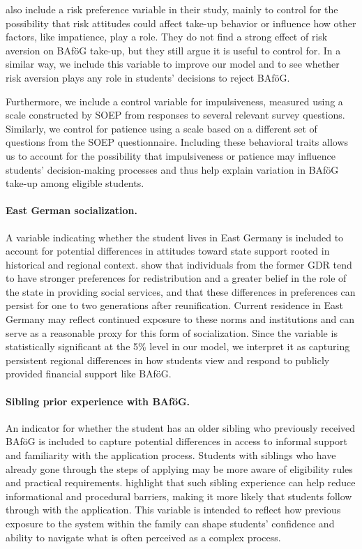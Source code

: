 \cite{herber_non-take-up_2019} also include a risk preference variable in their study, mainly to control for the possibility that risk attitudes could affect take-up behavior or influence how other factors, like impatience, play a role. 
They do not find a strong effect of risk aversion on BAföG take-up, but they still argue it is useful to control for. 
In a similar way, we include this variable to improve our model and to see whether risk aversion plays any role in students’ decisions to reject BAföG.

Furthermore, we include a control variable for impulsiveness, measured using a scale constructed by SOEP from responses to several relevant survey questions.
Similarly, we control for patience using a scale based on a different set of questions from the SOEP questionnaire.
Including these behavioral traits allows us to account for the possibility that impulsiveness or patience may influence students’ decision-making processes and thus help explain variation in BAföG take-up among eligible students.

\paragraph{East German socialization.}  A variable indicating whether the student lives in East Germany is included to account for potential differences in attitudes toward state support rooted in historical and regional context. \cite{alesina_good-bye_2007} show that individuals from the former GDR tend to have stronger preferences for redistribution and a greater belief in the role of the state in providing social services, and that these differences in preferences can persist for one to two generations after reunification. Current residence in East Germany may reflect continued exposure to these norms and institutions and can serve as a reasonable proxy for this form of socialization. Since the variable is statistically significant at the 5\% level in our model, we interpret it as capturing persistent regional differences in how students view and respond to publicly provided financial support like BAföG.

\paragraph{Sibling prior experience with BAföG.} An indicator for whether the student has an older sibling who previously received BAföG is included to capture potential differences in access to informal support and familiarity with the application process. Students with siblings who have already gone through the steps of applying may be more aware of eligibility rules and practical requirements. \cite{herber_non-take-up_2019} highlight that such sibling experience can help reduce informational and procedural barriers, making it more likely that students follow through with the application. This variable is intended to reflect how previous exposure to the system within the family can shape students’ confidence and ability to navigate what is often perceived as a complex process.

